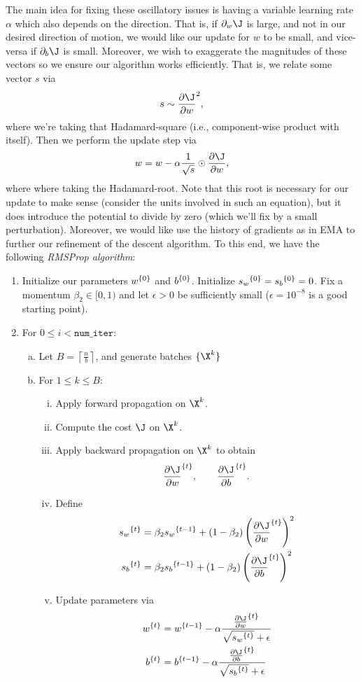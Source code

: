The main idea for fixing these oscillatory issues is having a variable learning rate $\alpha$ which also depends on the direction.  That is, if $\partial_w\J$ is large, and not in our desired direction of motion, we would like our update for $w$ to be small, and vice-versa if $\partial_b\J$ is small.  Moreover, we wish to exaggerate the magnitudes of these vectors so we ensure our algorithm works efficiently.  That is, we relate some vector $s$ via
$$s\sim\frac{\partial\J}{\partial w}^2,$$
where we're taking that Hadamard-square (i.e., component-wise product with itself).  Then we perform the update step via
$$w=w-\alpha\frac{1}{\sqrt{s}}\odot\frac{\partial\J}{\partial w},$$
where where taking the Hadamard-root.  Note that this root is necessary for our update to make sense (consider the units involved in such an equation), but it does introduce the potential to divide by zero (which we'll fix by a small perturbation).  Moreover, we would like use the history of gradients as in EMA to further our refinement of the descent algorithm.  To this end, we have the following \textit{RMSProp algorithm}:
\begin{enumerate}
	\item Initialize our parameters ${w}^{\{{0}\}}$ and ${b}^{\{{0}\}}$.  Initialize ${s_w}^{\{{0}\}}={s_b}^{\{{0}\}}=0$.  Fix a momentum $\beta_2\in[0,1)$ and let $\epsilon>0$ be sufficiently small ($\epsilon=10^{-8}$ is a good starting point).
	\item For $0\leq i<\texttt{num\_iter}$:
	\begin{enumerate}[a.]
		\item Let $B=\left\lceil\frac{n}{b}\right\rceil$, and generate batches $\{\X^k\}$
		\item For $1\leq k\leq B$:
		\begin{enumerate}[i.]
			\item Apply forward propagation on $\X^k$.
			\item Compute the cost $\J$ on $\X^k$.
			\item Apply backward propagation on $\X^k$ to obtain
			$$\iter{\frac{\partial\J}{\partial w}}{t},\qquad \iter{\frac{\partial\J}{\partial b}}{t}.$$
			\item Define
			\begin{align*}
				\iter{s_w}{t}&=\beta_2\iter{s_w}{t-1}+(1-\beta_2)\left(\iter{\frac{\partial\J}{\partial w}}{t}\right)^2\\
				\iter{s_b}{t}&=\beta_2\iter{s_b}{t-1}+(1-\beta_2)\left(\iter{\frac{\partial\J}{\partial b}}{t}\right)^2
			\end{align*}
			\item Update parameters via
			\begin{align*}
				\iter{w}{t}&=\iter{w}{t-1}-\alpha\frac{\iter{\frac{\partial\J}{\partial w}}{t}}{\sqrt{\iter{s_w}{t}}+\epsilon}\\
				\iter{b}{t}&=\iter{b}{t-1}-\alpha\frac{\iter{\frac{\partial\J}{\partial b}}{t}}{\sqrt{\iter{s_b}{t}}+\epsilon}
			\end{align*}
		\end{enumerate}
	\end{enumerate}
\end{enumerate}



